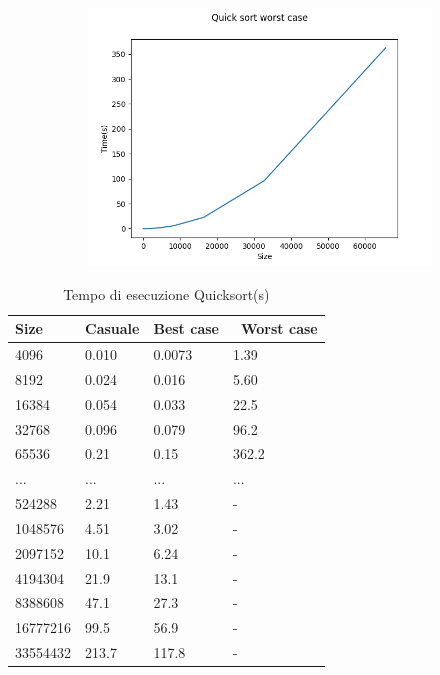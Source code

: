 \documentclass[]{article}
\begin{document}
\begin{figure}[H]
    \newpage
    \begin{subfigure}[b]{0.4\linewidth}
        \centering
        \includegraphics[width=\textwidth]{QuickSortWorstCase}
        \label{fig:quick_worst}
    \end{subfigure}
\end{figure}

\begin{table}[H]
\centering
\caption{Tempo di esecuzione Quicksort(s)}
\label{tab:quick}
\begin{tabular}{|l|l|l|l|} 
\hline
Size     & Casuale & Best case & ~Worst case  \\ 
\hline
4096     & 0.010   & 0.0073    & 1.39         \\
8192     & 0.024   & 0.016     & 5.60         \\
16384    & 0.054   & 0.033     & 22.5         \\
32768    & 0.096   & 0.079     & 96.2         \\
65536    & 0.21    & 0.15      & 362.2        \\
...      & ...     & ...       & ...          \\
524288   & 2.21    & 1.43      & -            \\
1048576  & 4.51    & 3.02      & -            \\
2097152  & 10.1    & 6.24      & -            \\
4194304  & 21.9    & 13.1      & -            \\
8388608  & 47.1    & 27.3      & -            \\
16777216 & 99.5    & 56.9      & -            \\
33554432 & 213.7   & 117.8     & -            \\
\hline
\end{tabular}
\end{table}
\end{document}
